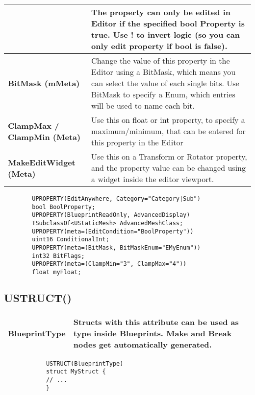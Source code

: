 \documentclass[10pt,a4paper]{article}
\begin{document}
\begin{multicols*}{2}
\begin{tabularx}{\columnwidth}{|p{3.5cm}|X|}
		&  The property can only be edited in Editor if the specified bool Property is true. Use ! to invert logic (so you can only edit property if bool is false). \\
		\hline \textbf{BitMask (mMeta)}
		& Change the value of this property in the Editor using a BitMask, which means you can select the value of each single bits. Use BitMask to specify a Enum, which entries will be used to name each bit. \\
		\hline \textbf{ClampMax / ClampMin (Meta)}
		& Use this on float or int property, to specify a maximum/minimum, that can be entered for this property in the Editor \\
		\hline \textbf {MakeEditWidget (Meta)}
		& Use this on a Transform or Rotator property, and the property value can be changed using a widget inside the editor viewport. \\
		\hline
	\end{tabularx}

	\begin{minipage}{\columnwidth}
	\begin{verbatim}
		UPROPERTY(EditAnywhere, Category="Category|Sub")
		bool BoolProperty;
		UPROPERTY(BlueprintReadOnly, AdvancedDisplay)
		TSubclassOf<UStaticMesh> AdvancedMeshClass;
		UPROPERTY(meta=(EditCondition="BoolProperty"))
		uint16 ConditionalInt;
		UPROPERTY(meta=(BitMask, BitMaskEnum="EMyEnum"))
		int32 BitFlags;
		UPROPERTY(meta=(ClampMin="3", ClampMax="4"))
		float myFloat;
	\end{verbatim}
\end{minipage}

	
	\subsection{USTRUCT()}
	
	\begin{tabularx}{\columnwidth}{|p{3.5cm}|X|}
		\hline \textbf{BlueprintType}
		& Structs with this attribute can be used as type inside Blueprints. Make and Break nodes get automatically generated.\\
		\hline
	\end{tabularx}
	
	\begin{minipage}{\columnwidth}
		\begin{verbatim}
			USTRUCT(BlueprintType)
			struct MyStruct {
			// ...
			}	
		\end{verbatim}
	\end{minipage}


\end{multicols*}
\end{document}
